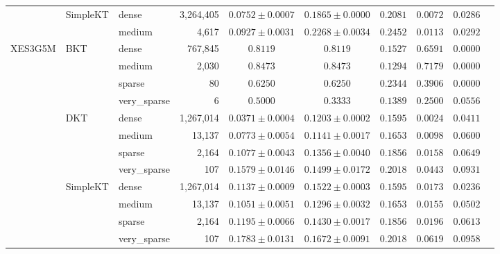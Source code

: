 \begin{table}[t]
\begin{tabular}{lllrcccccc}
 & SimpleKT & dense & 3,264,405 & $0.0752 \pm 0.0007$ & $0.1865 \pm 0.0000$ & $0.2081$ & $0.0072$ & $0.0286$ \\
 &  & medium & 4,617 & $0.0927 \pm 0.0031$ & $0.2268 \pm 0.0034$ & $0.2452$ & $0.0113$ & $0.0292$ \\
\midrule
XES3G5M & BKT & dense & 767,845 & $0.8119$ & $0.8119$ & $0.1527$ & $0.6591$ & $0.0000$ \\
 &  & medium & 2,030 & $0.8473$ & $0.8473$ & $0.1294$ & $0.7179$ & $0.0000$ \\
 &  & sparse & 80 & $0.6250$ & $0.6250$ & $0.2344$ & $0.3906$ & $0.0000$ \\
 &  & very\_sparse & 6 & $0.5000$ & $0.3333$ & $0.1389$ & $0.2500$ & $0.0556$ \\
 & DKT & dense & 1,267,014 & $0.0371 \pm 0.0004$ & $0.1203 \pm 0.0002$ & $0.1595$ & $0.0024$ & $0.0411$ \\
 &  & medium & 13,137 & $0.0773 \pm 0.0054$ & $0.1141 \pm 0.0017$ & $0.1653$ & $0.0098$ & $0.0600$ \\
 &  & sparse & 2,164 & $0.1077 \pm 0.0043$ & $0.1356 \pm 0.0040$ & $0.1856$ & $0.0158$ & $0.0649$ \\
 &  & very\_sparse & 107 & $0.1579 \pm 0.0146$ & $0.1499 \pm 0.0172$ & $0.2018$ & $0.0443$ & $0.0931$ \\
 & SimpleKT & dense & 1,267,014 & $0.1137 \pm 0.0009$ & $0.1522 \pm 0.0003$ & $0.1595$ & $0.0173$ & $0.0236$ \\
 &  & medium & 13,137 & $0.1051 \pm 0.0051$ & $0.1296 \pm 0.0032$ & $0.1653$ & $0.0155$ & $0.0502$ \\
 &  & sparse & 2,164 & $0.1195 \pm 0.0066$ & $0.1430 \pm 0.0017$ & $0.1856$ & $0.0196$ & $0.0613$ \\
 &  & very\_sparse & 107 & $0.1783 \pm 0.0131$ & $0.1672 \pm 0.0091$ & $0.2018$ & $0.0619$ & $0.0958$ \\
\bottomrule
\end{tabular}
\end{table}
